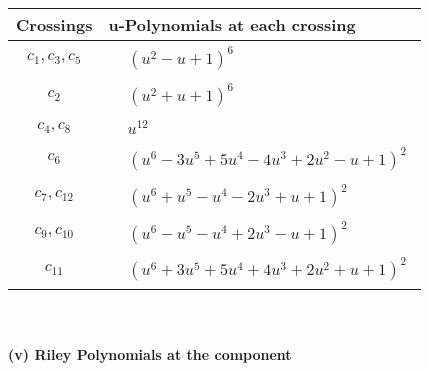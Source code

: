 \documentclass[1p]{elsarticle_modified}
\theoremstyle{definition}
\begin{document}
\begin{tabular}{m{50pt}|m{274pt}}
Crossings & \hspace{64pt}u-Polynomials at each crossing \\
\hline $$\begin{aligned}c_{1},c_{3},c_{5}\end{aligned}$$&$\begin{aligned}
&(u^2- u+1)^6
\end{aligned}$\\
\hline $$\begin{aligned}c_{2}\end{aligned}$$&$\begin{aligned}
&(u^2+u+1)^6
\end{aligned}$\\
\hline $$\begin{aligned}c_{4},c_{8}\end{aligned}$$&$\begin{aligned}
&u^{12}
\end{aligned}$\\
\hline $$\begin{aligned}c_{6}\end{aligned}$$&$\begin{aligned}
&(u^6-3 u^5+5 u^4-4 u^3+2 u^2- u+1)^2
\end{aligned}$\\
\hline $$\begin{aligned}c_{7},c_{12}\end{aligned}$$&$\begin{aligned}
&(u^6+u^5- u^4-2 u^3+u+1)^2
\end{aligned}$\\
\hline $$\begin{aligned}c_{9},c_{10}\end{aligned}$$&$\begin{aligned}
&(u^6- u^5- u^4+2 u^3- u+1)^2
\end{aligned}$\\
\hline $$\begin{aligned}c_{11}\end{aligned}$$&$\begin{aligned}
&(u^6+3 u^5+5 u^4+4 u^3+2 u^2+u+1)^2
\end{aligned}$\\
\hline
\end{tabular}\\~\\
\newpage\renewcommand{\arraystretch}{1}
\flushleft \textbf{(v) Riley Polynomials at the component}\newline \\
\end{document}
